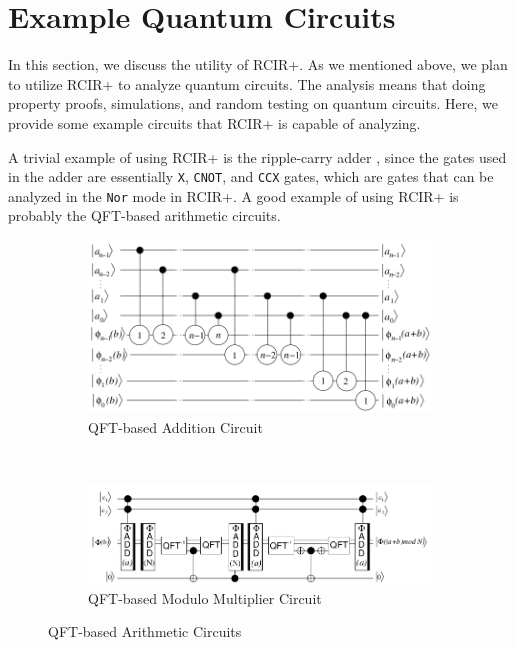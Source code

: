 \section{Example Quantum Circuits}
\label{sec:example}

In this section, we discuss the utility of RCIR+. As we mentioned above, we plan to utilize RCIR+ to analyze quantum circuits. The analysis means that doing property proofs, simulations, and random testing on quantum circuits. 
Here, we provide some example circuits that RCIR+ is capable of analyzing.

A trivial example of using RCIR+ is the ripple-carry adder \cite{ripple-carry}, since the gates used in the adder are essentially \texttt{X}, \texttt{CNOT}, and \texttt{CCX} gates, which are gates that can be analyzed in the \texttt{Nor} mode in RCIR+. 
A good example of using RCIR+ is probably the QFT-based arithmetic circuits. 

\begin{figure}[h]
\centering
     \begin{subfigure}[b]{0.6\textwidth}
         \centering
         \includegraphics[width=1\textwidth]{qft-addition.png}
         \caption{QFT-based Addition Circuit}
         \label{fig:addition}
     \end{subfigure}%
     ~
     \begin{subfigure}[b]{0.6\textwidth}
         \centering
         \includegraphics[width=1\textwidth]{qft-mod.png}
         \caption{QFT-based Modulo Multiplier Circuit}
         \label{fig:mod}
     \end{subfigure}

\caption{QFT-based Arithmetic Circuits}
\label{fig:qft-circuit}
\end{figure}


